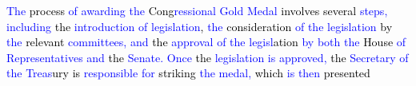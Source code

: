 \begin{tcolorbox}
    \textcolor{blue}{The} \textcolor{black}{process} \textcolor{blue}{of} \textcolor{blue}{award}\textcolor{blue}{ing} \textcolor{blue}{the} \textcolor{black}{Cong}\textcolor{blue}{r}\textcolor{blue}{essional} \textcolor{blue}{Gold} \textcolor{blue}{Medal} \textcolor{black}{involves} \textcolor{black}{several} \textcolor{blue}{steps}\textcolor{blue}{,} \textcolor{blue}{including} \textcolor{black}{the} \textcolor{blue}{introduction} \textcolor{blue}{of} \textcolor{blue}{legisl}\textcolor{blue}{ation}\textcolor{black}{,} \textcolor{blue}{the} \textcolor{black}{consideration} \textcolor{blue}{of} \textcolor{blue}{the} \textcolor{blue}{legisl}\textcolor{blue}{ation} \textcolor{black}{by} \textcolor{blue}{the} \textcolor{black}{relevant} \textcolor{blue}{comm}\textcolor{blue}{itte}\textcolor{blue}{es}\textcolor{blue}{,} \textcolor{blue}{and} \textcolor{black}{the} \textcolor{blue}{appro}\textcolor{blue}{val} \textcolor{blue}{of} \textcolor{blue}{the} \textcolor{blue}{legisl}\textcolor{black}{ation} \textcolor{blue}{by} \textcolor{blue}{both} \textcolor{blue}{the} \textcolor{black}{House} \textcolor{blue}{of} \textcolor{blue}{Representatives} \textcolor{blue}{and} \textcolor{black}{the} \textcolor{blue}{Senate}\textcolor{blue}{.} \textcolor{blue}{Once} \textcolor{black}{the} \textcolor{blue}{legisl}\textcolor{blue}{ation} \textcolor{blue}{is} \textcolor{blue}{approved}\textcolor{blue}{,} \textcolor{black}{the} \textcolor{blue}{Secretary} \textcolor{blue}{of} \textcolor{blue}{the} \textcolor{blue}{Tre}\textcolor{blue}{as}\textcolor{black}{ury} \textcolor{black}{is} \textcolor{blue}{responsible} \textcolor{blue}{for} \textcolor{black}{striking} \textcolor{blue}{the} \textcolor{blue}{medal}\textcolor{blue}{,} \textcolor{black}{which} \textcolor{blue}{is} \textcolor{blue}{then} \textcolor{black}{presented}
    

\end{tcolorbox}
